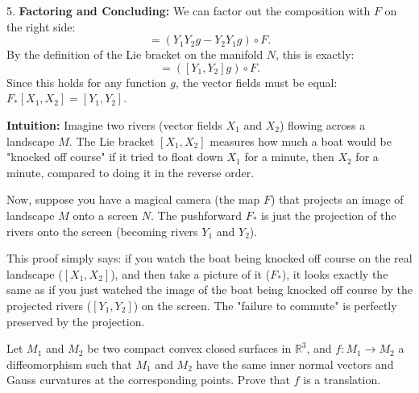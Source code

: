 \begin{solution}
5. \textbf{Factoring and Concluding:}
We can factor out the composition with $F$ on the right side:
\[ = (Y_1 Y_2 g - Y_2 Y_1 g) \circ F. \]
By the definition of the Lie bracket on the manifold $N$, this is exactly:
\[ = ([Y_1, Y_2]g) \circ F. \]
Since this holds for any function $g$, the vector fields must be equal: $F_*[X_1, X_2] = [Y_1, Y_2]$.
\par\vspace{\baselineskip}

\textbf{Intuition:}
Imagine two rivers (vector fields $X_1$ and $X_2$) flowing across a landscape $M$. The Lie bracket $[X_1, X_2]$ measures how much a boat would be "knocked off course" if it tried to float down $X_1$ for a minute, then $X_2$ for a minute, compared to doing it in the reverse order.
\par\vspace{\baselineskip}

Now, suppose you have a magical camera (the map $F$) that projects an image of landscape $M$ onto a screen $N$. The pushforward $F_*$ is just the projection of the rivers onto the screen (becoming rivers $Y_1$ and $Y_2$). 
\par\vspace{\baselineskip}

This proof simply says: if you watch the boat being knocked off course on the real landscape ($[X_1, X_2]$), and then take a picture of it ($F_*$), it looks exactly the same as if you just watched the image of the boat being knocked off course by the projected rivers ($[Y_1, Y_2]$) on the screen. The "failure to commute" is perfectly preserved by the projection.
\end{solution}

\begin{exercise}
\label{geometry:2015:10}
Let $M_{1}$ and $M_{2}$ be two compact convex closed surfaces in $\mathbb{R}^{3}$, and $f : M_{1} \to M_{2}$ a diffeomorphism such that $M_{1}$ and $M_{2}$ have the same inner normal vectors and Gauss curvatures at the corresponding points. Prove that $f$ is a translation.
\end{exercise}

